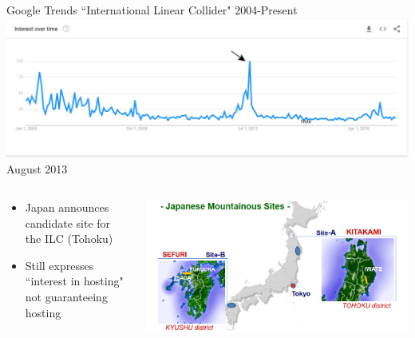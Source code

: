 \documentclass[10pt]{beamer}
\begin{document}
\begin{frame}
Google Trends ``International Linear Collider" 2004-Present
\includegraphics[scale=0.25]{timeline4.png}\\
August 2013 
\begin{columns}
\begin{column}{0.5\textwidth}
\begin{itemize}
\scriptsize
\item Japan announces candidate site for the ILC (Tohoku)
\item Still expresses ``interest in hosting" not guaranteeing hosting
\end{itemize}
\end{column}
\begin{column}{0.5\textwidth}
\includegraphics[scale=0.2]{japanese_sites.jpg}\\
\end{column}
\end{columns}

\end{frame}
\end{document}
